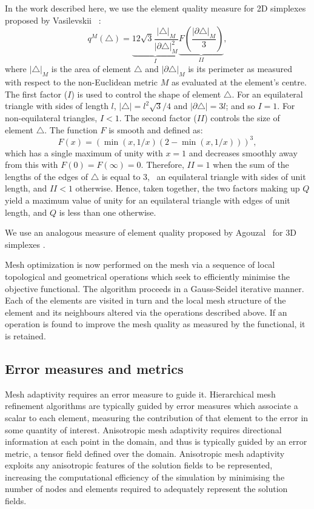 In the work described here, we use the element quality measure for 2D
simplexes proposed by Vasilevskii \etal\
\cite{vasilevskii1999adaptive}:
\begin{equation}\label{eqn:quality2D}
q^M(\triangle) = \underbrace{12\sqrt{3}\frac{|\triangle|_M}{|\partial\triangle|_M^2}}_{I} \underbrace{F\left(\frac{|\partial\triangle|_M}{3}\right)}_{II},
\end{equation}
where $|\triangle|_M$ is the area of element $\triangle$ and
$|\partial\triangle|_M$ is its perimeter as measured with respect to
the non-Euclidean metric $M$ as evaluated at the element's centre. The
first factor ($I$) is used to control the shape of element
$\triangle$. For an equilateral triangle with sides of length $l$,
$|\triangle| = l^2\sqrt{3}/4$ and $|\partial\triangle| = 3l$; and so
$I=1$. For non-equilateral triangles, $I<1$. The second factor ($II$)
controls the size of element $\triangle$. The function $F$ is smooth
and defined as:
\begin{equation}
F(x) = \left(\min(x, 1/x)(2 - \min(x, 1/x))\right)^3,
\end{equation}
which has a single maximum of
unity with $x=1$ and decreases smoothly away from this with
$F(0)=F(\infty)=0$. Therefore, $II=1$ when the sum of the lengths of the
edges of $\triangle$ is equal to $3$, \eg\ an equilateral triangle with
sides of unit length, and $II<1$ otherwise. Hence, taken together, the
two factors making up $Q$ yield a maximum value of unity for an
equilateral triangle with edges of unit length, and $Q$ is less than
one otherwise. 

We use an analogous measure of element quality proposed by Agouzal
\etal\ for 3D simplexes \cite{agouzal1999}.

Mesh optimization is now performed on the mesh via a sequence of local
topological and geometrical operations \citep{pain2001,freitag1997}
which seek to efficiently minimise the objective functional. The algorithm
proceeds in a Gauss-Seidel iterative manner. Each of the elements are
visited in turn and the local mesh structure of the element and its
neighbours altered via the operations described above. If an operation
is found to improve the mesh quality as measured by the functional,
it is retained.

\subsection{Error measures and metrics}
Mesh adaptivity requires an error measure to guide it. Hierarchical
mesh refinement algorithms are typically guided by error measures
which associate a scalar to each element, measuring the contribution
of that element to the error in some quantity of interest. Anisotropic
mesh adaptivity \citep{simpson1994, buscaglia1997, pain2001, li2005,
  frey2005} requires directional information at each point in the
domain, and thus is typically guided by an error metric, a tensor
field defined over the domain.  Anisotropic mesh adaptivity exploits
any anisotropic features of the solution fields to be represented,
increasing the computational efficiency of the simulation by
minimising the number of nodes and elements required to adequately
represent the solution fields.

